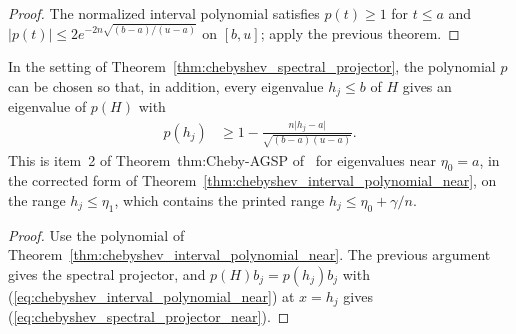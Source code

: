 \begin{proof}
    \leanok
    The normalized interval polynomial satisfies $p(t)\ge1$ for $t\le a$ and
    $\lvert p(t)\rvert\le2e^{-2n\sqrt{(b-a)/(u-a)}}$ on $[b,u]$; apply the
    previous theorem.
\end{proof}

\begin{theorem}
    \label{thm:chebyshev_spectral_projector_near}
    \leanok
    In the setting of Theorem~\ref{thm:chebyshev_spectral_projector}, the
    polynomial $p$ can be chosen so that, in addition, every eigenvalue
    $h_j\le b$ of $H$ gives an eigenvalue of $p(H)$ with
    \begin{align}
        p(h_j) & \ge1-\frac{n\lvert h_j-a\rvert}{\sqrt{(b-a)(u-a)}}.
        \label{eq:chebyshev_spectral_projector_near}
    \end{align}
    This is item~2 of Theorem~thm:Cheby-AGSP
    of~\cite[lines 822--824]{Arad2016RigorousRG} for eigenvalues near
    $\eta_0=a$, in the corrected form of
    Theorem~\ref{thm:chebyshev_interval_polynomial_near}, on the range
    $h_j\le\eta_1$, which contains the printed range
    $h_j\le\eta_0+\gamma/n$.
\end{theorem}

\begin{proof}
    \leanok
    Use the polynomial of
    Theorem~\ref{thm:chebyshev_interval_polynomial_near}. The previous
    argument gives the spectral projector, and $p(H)b_j=p(h_j)b_j$ with
    (\ref{eq:chebyshev_interval_polynomial_near}) at $x=h_j$ gives
    (\ref{eq:chebyshev_spectral_projector_near}).
\end{proof}
